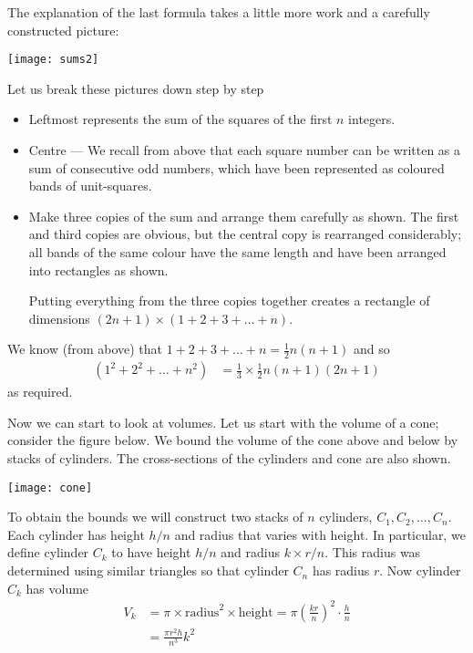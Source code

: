 The explanation of the last formula takes a little more work and a carefully
constructed picture:
\begin{center}
 \texttt{[image: sums2]}
\end{center}
Let us break these pictures down step by step
\begin{itemize}
 \item Leftmost represents the sum of the squares of the first $n$ integers.
 \item Centre --- We recall from above that each square number can be written as a sum of
consecutive odd numbers, which have been represented as coloured bands of unit-squares.
 \item Make three copies of the sum and arrange them carefully as shown. The first and
third copies are obvious, but the central copy is rearranged considerably; all
bands of the same colour have the same length and have been arranged into
rectangles as shown.

Putting everything from the three copies together creates a rectangle of dimensions
$(2n+1)\times(1+2+3+\dots+n)$.
\end{itemize}
We know (from above) that $1+2+3+\dots+n = \frac{1}{2} n(n+1)$ and so
\begin{align*}
  (1^2+2^2+\dots+n^2 ) &= \frac{1}{3} \times \frac{1}{2} n(n+1)(2n+1)
\end{align*}
as required.

Now we can start to look at volumes. Let us start with the volume of a cone; consider the
figure below. We bound the volume of the cone above and below by stacks of cylinders. The
cross-sections of the cylinders and cone are also shown.
\begin{center}
 \texttt{[image: cone]}
\end{center}
To obtain the bounds we will construct two stacks of $n$ cylinders, $C_1,C_2,\dots,C_n$.
Each cylinder has height $h/n$ and radius that varies with height. In particular, we
define cylinder $C_k$ to have height $h/n$ and radius $k \times r/n$. This radius was
determined using similar triangles so that cylinder $C_n$ has radius $r$. Now cylinder
$C_k$ has volume
\begin{align*}
  V_k &= \pi \times \text{radius}^2 \times \text{height}
  = \pi \left( \frac{kr}{n} \right)^2 \cdot \frac{h}{n}\\
  &= \frac{\pi r^2h}{n^3} k^2
\end{align*}

